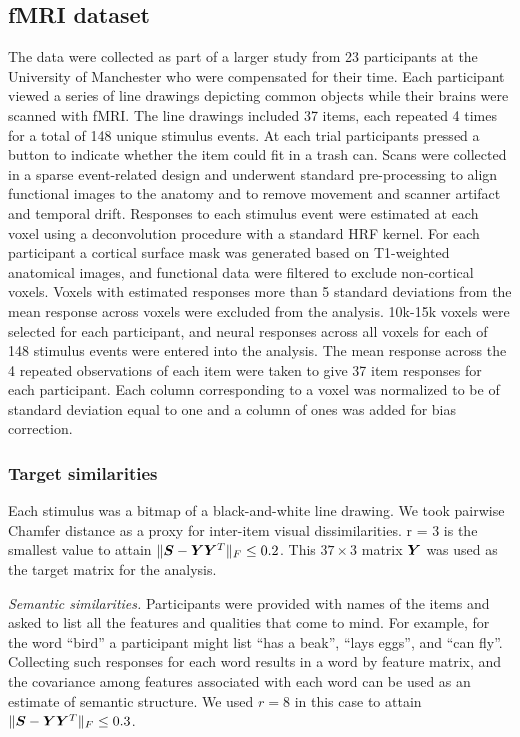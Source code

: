 \subsection{fMRI dataset} The data were collected as part of a larger study from 23
participants at the University of Manchester who were compensated for their time. Each
participant viewed a series of line drawings depicting common objects while their brains
were scanned with fMRI. The line drawings included 37 items, each repeated 4 times for a
total of 148 unique stimulus events. At each trial participants pressed a button to
indicate whether the item could fit in a trash can.
Scans were collected in a sparse event-related design and underwent standard
pre-processing to align functional images to the anatomy and to remove movement and
scanner artifact and temporal drift. Responses to each stimulus event were estimated at
each voxel using a deconvolution procedure with a standard HRF kernel. For each
participant a cortical surface mask was generated based on T1-weighted anatomical images,
and functional data were filtered to exclude non-cortical voxels. Voxels with estimated
responses more than 5 standard deviations from the mean response across voxels were
excluded from the analysis. 10k-15k voxels were selected for each participant, and neural
responses across all voxels for each of 148 stimulus events were entered into the
analysis. The mean response across the 4 repeated observations of each item were taken to
give 37 item responses for each participant. Each column corresponding to a voxel was
normalized to be of standard deviation equal to one and a column of ones was added for
bias correction.

\subsubsection*{Target similarities}
\ifdefined\SEMANTIC
\fi%
 Each stimulus was a bitmap of a black-and-white line
 drawing. We took pairwise Chamfer distance as a proxy for inter-item visual
 dissimilarities. r = 3 is the smallest value to attain $\|\boldsymbol{S} - \boldsymbol{Y}\boldsymbol{Y}^T\|_F \leq 0.2$.
 This $37 \times 3$ matrix $\boldsymbol{Y}$ was used as the target matrix for the analysis.

\ifdefined\SEMANTIC
\textit{Semantic similarities.}
Participants were provided with names of the items and
asked to list all the features and qualities that come to mind. For example, for the
word ``bird'' a participant might list ``has a beak'', ``lays eggs'', and ``can fly''.
Collecting such responses for each word results in a word by feature matrix, and the
covariance among features associated with each word can be used as an estimate of
semantic structure. We used $r = 8$ in this case to attain $\|\boldsymbol{S} - \boldsymbol{Y}\boldsymbol{Y}^T\|_F \leq
0.3$.
\fi%

